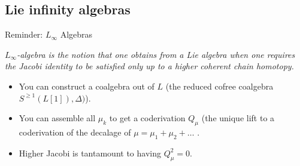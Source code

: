 \documentclass[beamer,10pt,handout]{standalone}  \Handouttrue
\begin{document}
\checkpoint
\subsection{Lie infinity algebras}
\begin{frame}{Reminder: $L_\infty$ Algebras}

		\emph{
			$L_\infty$-algebra is the notion that one obtains from a Lie algebra when one requires the Jacobi identity to be satisfied only up to a higher coherent chain homotopy.
		}
		\\
		\vspace{.5em}
		\begin{defblock}
			
		\end{defblock}	
	\pause

	\begin{itemize}
		\item<2-> You can construct a coalgebra out of $L$ 
			{\small \color{UniGreen} (the reduced cofree coalgebra $S^{\geq 1}(L[1]),\Delta)$)}.
		\item<3-> You can assemble all $\mu_k$ to get a coderivation $Q_\mu$
				{\small \color{UniGreen} (the unique lift to a coderivation of the decalage of $ \mu=	\mu_1+\mu_2 + \dots$ }.
		\item<4-> Higher Jacobi is tantamount to having $Q_\mu ^2 = 0$.

	\end{itemize}
\end{frame}
\end{document}
